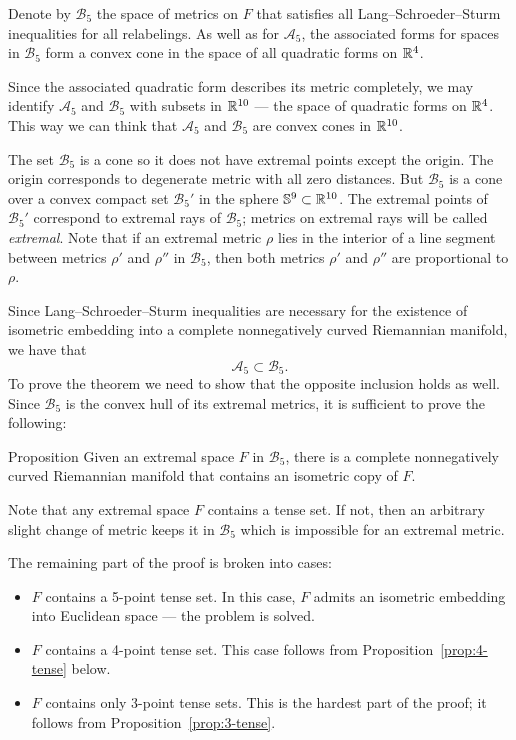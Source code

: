 \documentclass{article}
\begin{document}
Denote by $\mathcal{B}_5$ the space of metrics on $F$ that satisfies all Lang--Schroeder--Sturm inequalities for all relabelings.
As well as for $\mathcal{A}_5$, the associated forms for spaces in $\mathcal{B}_5$ form a convex cone in the space of all quadratic forms on $\mathbb{R}^4$.

Since the associated quadratic form describes its metric completely, we may identify $\mathcal{A}_5$ and $\mathcal{B}_5$ with subsets in $\mathbb{R}^{10}$ --- the space of quadratic forms on $\mathbb{R}^4$.
This way we can think that $\mathcal{A}_5$ and $\mathcal{B}_5$ are convex cones in $\mathbb{R}^{10}$.

The set $\mathcal{B}_5$ is a cone so it does not have extremal points except the origin.
The origin corresponds to degenerate metric with all zero distances.
But $\mathcal{B}_5$ is a cone over a convex compact set $\mathcal{B}_5'$ in the sphere $\mathbb{S}^9\subset \mathbb{R}^{10}$.
The extremal points of $\mathcal{B}_5'$ correspond to extremal rays of $\mathcal{B}_5$;
metrics on extremal rays will be called \emph{extremal}.
Note that if an extremal metric $\rho$ lies in the interior of a line segment between metrics $\rho'$ and $\rho''$ in $\mathcal{B}_5$, then both metrics $\rho'$ and $\rho''$ are proportional to $\rho$.

Since Lang--Schroeder--Sturm inequalities are necessary for the existence of isometric embedding into a complete nonnegatively curved Riemannian manifold,
we have that 
\[\mathcal{A}_5\subset\mathcal{B}_5.\]
To prove the theorem we need to show that the opposite inclusion holds as well.
Since $\mathcal{B}_5$ is the convex hull of its extremal metrics, it is sufficient to prove the following:

\begin{thm}{Proposition}\label{prop:main}
Given an extremal space $F$ in $\mathcal{B}_5$, there is a complete nonnegatively curved Riemannian manifold that contains an isometric copy of $F$.
\end{thm}

Note that any extremal space  $F$ contains a tense set.
If not, then an arbitrary slight change of metric keeps it in $\mathcal{B}_5$ which is impossible for an extremal metric.

The remaining part of the proof is broken into cases:
\begin{itemize}
\item $F$ contains a 5-point tense set.
In this case, $F$ admits an isometric embedding into Euclidean space --- the problem is solved.
\item $F$ contains a 4-point  tense set.
This case follows from Proposition~\ref{prop:4-tense} below.
\item $F$ contains only 3-point  tense sets. This is the hardest part of the proof; it follows from Proposition~\ref{prop:3-tense}.
\qeds
\end{itemize}
\end{document}
